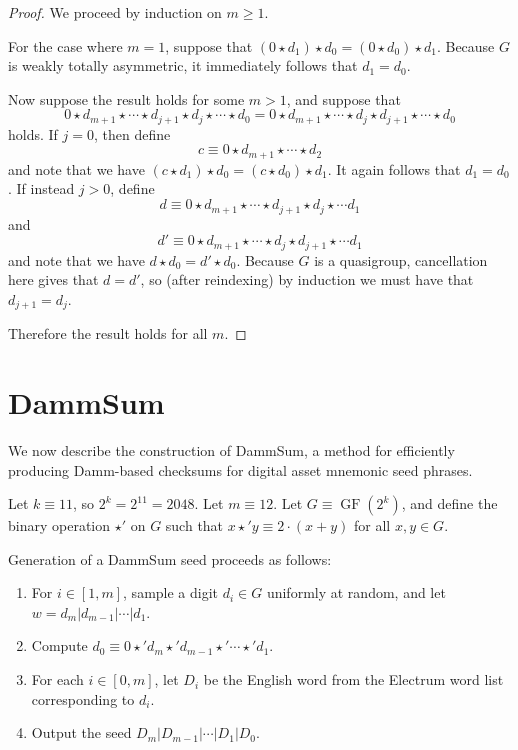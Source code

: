 \documentclass{article}
\theoremstyle{plain}
\theoremstyle{definition}
\newcommand{\GF}{\operatorname{GF}}
\begin{document}
\begin{proof}
	We proceed by induction on $m \geq 1$.

	For the case where $m = 1$, suppose that $(0 \star d_1) \star d_0 = (0 \star d_0) \star d_1$.
	Because $G$ is weakly totally asymmetric, it immediately follows that $d_1 = d_0$.

	Now suppose the result holds for some $m > 1$, and suppose that 
	\[ 0 \star d_{m+1} \star \cdots \star d_{j+1} \star d_j \star \cdots \star d_0 = 0 \star d_{m+1} \star \cdots \star d_j \star d_{j+1} \star \cdots \star d_0 \]
	holds.
	If $j = 0$, then define
	\[ c \equiv 0 \star d_{m+1} \star \cdots \star d_2 \]
	and note that we have $(c \star d_1) \star d_0 = (c \star d_0) \star d_1$.
	It again follows that $d_1 = d_0$.
	If instead $j > 0$, define
	\[ d \equiv 0 \star d_{m+1} \star \cdots \star d_{j+1} \star d_j \star \cdots d_1 \]
	and
	\[ d' \equiv 0 \star d_{m+1} \star \cdots \star d_j \star d_{j+1} \star \cdots d_1 \]
	and note that we have $d \star d_0 = d' \star d_0$.
	Because $G$ is a quasigroup, cancellation here gives that $d = d'$, so (after reindexing) by induction we must have that $d_{j+1} = d_j$.

	Therefore the result holds for all $m$.
\end{proof}

\section{DammSum}

We now describe the construction of DammSum, a method for efficiently producing Damm-based checksums for digital asset mnemonic seed phrases.

Let $k \equiv 11$, so $2^k = 2^{11} = 2048$.
Let $m \equiv 12$.
Let $G \equiv \GF(2^k)$, and define the binary operation $\star'$ on $G$ such that $x \star' y \equiv 2 \cdot (x + y)$ for all $x,y \in G$.

Generation of a DammSum seed proceeds as follows:
\begin{enumerate}
	\item For $i \in [1,m]$, sample a digit $d_i \in G$ uniformly at random, and let $w = d_m | d_{m-1} | \cdots | d_1$.
	\item Compute $d_0 \equiv 0 \star' d_m \star' d_{m-1} \star' \cdots \star' d_1$.
	\item For each $i \in [0,m]$, let $D_i$ be the English word from the Electrum word list corresponding to $d_i$.
	\item Output the seed $D_m | D_{m-1} | \cdots | D_1 | D_0$.
\end{enumerate}
\end{document}
